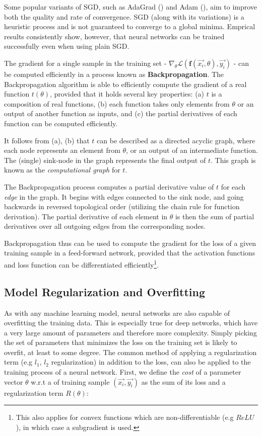 Some popular variants of SGD, such as AdaGrad (\cite{adagrad}) and Adam (\cite{adam}), aim to improve both the quality and rate of convergence. SGD (along with its variations) is a heuristic process and is not guaranteed to converge to a global minima. Emprical results consistently show, however, that neural networks can be trained successfully even when using plain SGD.

The gradient for a single sample in the training set -  $\nabla_\theta \mathcal{L}(\textbf{f}(\vec{x_i}, \theta), \vec{y_i})$ - can be computed efficiently in a process known as \textbf{Backpropagation}. The Backpropagation
algorithm is able to efficiently compute the gradient of a real function $t(\theta)$, provided that it holds several key properties: (a) $t$ is a composition of real functions, (b) each function takes only elements from $\theta$ or an output of another function as inputs, and (c) the partial derivatives of each function can be computed efficiently.  

It follows from (a), (b) that $t$ can be described as a directed acyclic graph, where each node represents an element from $\theta$, or an output of an intermediate function. The (single) sink-node in the graph represents the final output of $t$. This graph is known as  the \textit{computational graph} for $t$.

The Backpropagation process computes a partial derivative value of $t$ for each \emph{edge} in the graph. It begins with edges connected to the sink node, and going backwards in reversed topological order (utilizing the chain rule for function derivation). The partial derivative of each element in $\theta$ is then the sum of partial derivatives over all outgoing edges from the corresponding nodes.

Backpropagation thus can be used to compute the gradient for the loss of a given training sample in a feed-forward network, provided that the activation functions and loss function can be differentiated efficiently\footnote{This also applies for convex functions which are non-differentiable (e.g $ReLU$), in which case a subgradient is used.}.

\subsection{Model Regularization and Overfitting} \label{sec:regulaization}

As with any machine learning model, neural networks are also capable of overfitting the training data. This is especially true for deep networks, which have a very large amount of parameters and therefore more complexity. Simply picking the set of parameters that minimizes the loss on the training set is likely to overfit, at least to some degree. The common method of applying a regularization term (e.g $l_1$, $l_2$ regularization) in addition to the loss, can also be applied to the training process of a neural network. First, we define the \emph{cost} of a parameter vector $\theta$ w.r.t a of training sample $(\vec{x_i}, \vec{y_i})$ as the sum of its loss and a regularization term $R(\theta)$:

